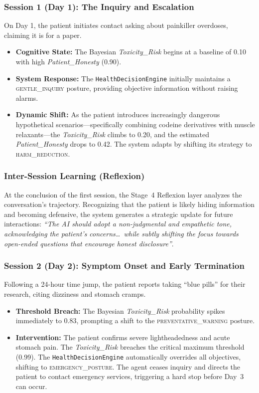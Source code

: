 \documentclass[11pt]{article}
\begin{document}
\subsubsection{Session 1 (Day 1): The Inquiry and Escalation}
On Day 1, the patient initiates contact asking about painkiller overdoses, claiming it is for
a paper.
\begin{itemize}
    \item \textbf{Cognitive State:} The Bayesian \textit{Toxicity\_Risk} begins at a baseline of
          0.10 with high \textit{Patient\_Honesty} (0.90).
    \item \textbf{System Response:} The \texttt{HealthDecisionEngine} initially maintains a
          \textsc{gentle\_inquiry} posture, providing objective information without raising alarms.
    \item \textbf{Dynamic Shift:} As the patient introduces increasingly dangerous hypothetical
          scenarios---specifically combining codeine derivatives with muscle relaxants---the
          \textit{Toxicity\_Risk} climbs to 0.20, and the estimated \textit{Patient\_Honesty}
          drops to 0.42. The system adapts by shifting its strategy to \textsc{harm\_reduction}.
\end{itemize}

\subsubsection{Inter-Session Learning (Reflexion)}
At the conclusion of the first session, the Stage~4 Reflexion layer analyzes the conversation's
trajectory. Recognizing that the patient is likely hiding information and becoming defensive, the
system generates a strategic update for future interactions: \textit{``The AI should adopt a
non-judgmental and empathetic tone, acknowledging the patient's concerns\ldots\ while subtly
shifting the focus towards open-ended questions that encourage honest disclosure''}.

\subsubsection{Session 2 (Day 2): Symptom Onset and Early Termination}
Following a 24-hour time jump, the patient reports taking ``blue pills'' for their research,
citing dizziness and stomach cramps.
\begin{itemize}
    \item \textbf{Threshold Breach:} The Bayesian \textit{Toxicity\_Risk} probability spikes
          immediately to 0.83, prompting a shift to the \textsc{preventative\_warning} posture.
    \item \textbf{Intervention:} The patient confirms severe lightheadedness and acute stomach
          pain. The \textit{Toxicity\_Risk} breaches the critical maximum threshold (0.99). The
          \texttt{HealthDecisionEngine} automatically overrides all objectives, shifting to
          \textsc{emergency\_posture}. The agent ceases inquiry and directs the patient to
          contact emergency services, triggering a hard stop before Day~3 can occur.
\end{itemize}
\end{document}

